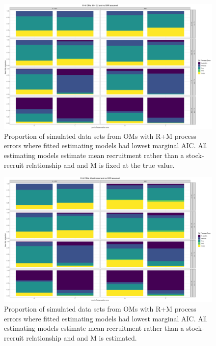 \documentclass[
  12pt,
]{article}
\begin{document}
\begin{landscape}
\begin{figure}
\caption{Proportion of simulated data sets from OMs with R+M process errors where fitted estimating models had lowest marginal AIC. All estimating models estimate mean recruitment rather than a stock-recruit relationship and and M is fixed at the true value.} \label{M_om_proportion_best_aic_R_MF}
\begin{center}
\includegraphics[width = \textwidth]{M_om_proportion_best_aic_R_MF.png}
\end{center}
\end{figure}
\end{landscape}

\begin{landscape}
\begin{figure}
\caption{Proportion of simulated data sets from OMs with R+M process errors where fitted estimating models had lowest marginal AIC. All estimating models estimate mean recruitment rather than a stock-recruit relationship and and M is estimated.} \label{M_om_proportion_best_aic_R_ME}
\begin{center}
\includegraphics[width = \textwidth]{M_om_proportion_best_aic_R_ME.png}
\end{center}
\end{figure}
\end{landscape}
\end{document}
